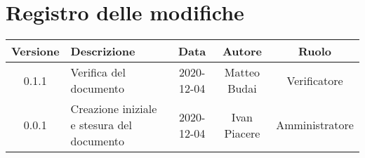 \section*{Registro delle modifiche}

\begin{center}
	\begin{longtable}{|c|p{5cm}|c|c|c|}
	\hline
	\rowcolor{lighter-grayer}
	\textbf{Versione} & \textbf{Descrizione} & \textbf{Data} & \textbf{Autore} & \textbf{Ruolo} \\
	\hline
	\endfirsthead


	\hline
	0.1.1 & Verifica del documento & 2020-12-04 & Matteo Budai & Verificatore \\
	\hline
	0.0.1 & Creazione iniziale e stesura del documento & 2020-12-04 & Ivan Piacere & Amministratore \\
	\hline
	\end{longtable}
\end{center}